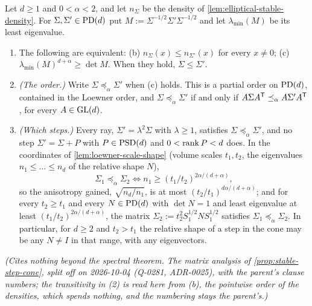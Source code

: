 \begin{lemma}
\label{lem:stable-step-order}
\leanok
Let $d \ge 1$ and $0 < \alpha < 2$, and let $n_\Sigma$ be the density of
\ref{lem:elliptical-stable-density}. For $\Sigma, \Sigma' \in \mathrm{PD}(d)$ put
$M := \Sigma^{-1/2}\Sigma'\Sigma^{-1/2}$ and let $\lambda_{\min}(M)$ be its least eigenvalue.
\begin{enumerate}
\item[(1)] The following are equivalent: (b) $n_\Sigma(x) \le n_{\Sigma'}(x)$ for every $x \ne 0$;
(c) $\lambda_{\min}(M)^{d+\alpha} \ge \det M$. When they hold, $\Sigma \le \Sigma'$.
\item[(2)] \emph{(The order.)} Write $\Sigma \preceq_\alpha \Sigma'$ when (c) holds. This is a partial
order on $\mathrm{PD}(d)$, contained in the Loewner order, and $\Sigma \preceq_\alpha \Sigma'$ if and only if
$A\Sigma A^{\mathsf{T}} \preceq_\alpha A\Sigma'A^{\mathsf{T}}$, for every $A \in \mathrm{GL}(d)$.
\item[(3)] \emph{(Which steps.)} Every ray, $\Sigma' = \lambda^2\Sigma$ with $\lambda \ge 1$, satisfies
$\Sigma \preceq_\alpha \Sigma'$, and no step $\Sigma' = \Sigma + P$ with $P \in \mathrm{PSD}(d)$ and
$0 < \operatorname{rank} P < d$ does. In the coordinates of \ref{lem:loewner-scale-shape} (volume scales $t_1, t_2$,
the eigenvalues $n_1 \le \dots \le n_d$ of the relative shape $N$),
\[
  \Sigma_1 \preceq_\alpha \Sigma_2 \Longleftrightarrow n_1 \ge (t_1/t_2)^{2\alpha/(d+\alpha)} ,
\]
so the anisotropy gained, $\sqrt{n_d/n_1}$, is at most $(t_2/t_1)^{d\alpha/(d+\alpha)}$; and for
every $t_2 \ge t_1$ and every $N \in \mathrm{PD}(d)$ with $\det N = 1$ and least eigenvalue at least
$(t_1/t_2)^{2\alpha/(d+\alpha)}$, the matrix $\Sigma_2 := t_2^2S_1^{1/2}NS_1^{1/2}$ satisfies
$\Sigma_1 \preceq_\alpha \Sigma_2$. In particular, for $d \ge 2$ and $t_2 > t_1$ the relative shape
of a step in the cone may be any $N \ne I$ in that range, with any eigenvectors.
\end{enumerate}
\statusT\quad\emph{(Cites nothing beyond the spectral theorem. The matrix analysis of
\ref{prop:stable-step-cone}, split off on 2026-10-04 (Q-0281, ADR-0025), with the parent's clause
numbers; the transitivity in (2) is read here from (b), the pointwise order of the densities, which
spends nothing, and the numbering stays the parent's.)}
\end{lemma}

